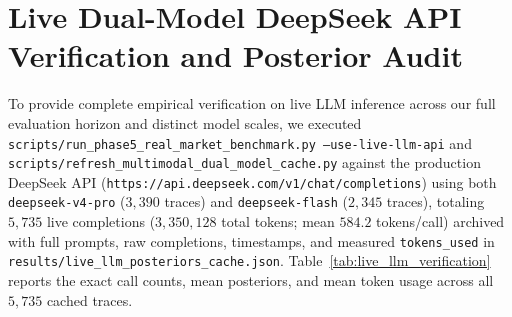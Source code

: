 \documentclass[10pt,a4paper,twocolumn]{article}
\begin{document}
\section{Live Dual-Model DeepSeek API Verification and Posterior Audit}
\label{app:live_llm}

To provide complete empirical verification on live LLM inference across our full evaluation horizon and distinct model scales, we executed \texttt{scripts/run\_phase5\_real\_market\_benchmark.py --use-live-llm-api} and \texttt{scripts/refresh\_multimodal\_dual\_model\_cache.py} against the production DeepSeek API (\texttt{https://api.deepseek.com/v1/chat/completions}) using both \texttt{deepseek-v4-pro} ($3,390$ traces) and \texttt{deepseek-flash} ($2,345$ traces), totaling $5,735$ live completions ($3,350,128$ total tokens; mean $584.2$ tokens/call) archived with full prompts, raw completions, timestamps, and measured \texttt{tokens\_used} in \texttt{results/live\_llm\_posteriors\_cache.json}. Table~\ref{tab:live_llm_verification} reports the exact call counts, mean posteriors, and mean token usage across all $5,735$ cached traces.
\end{document}
